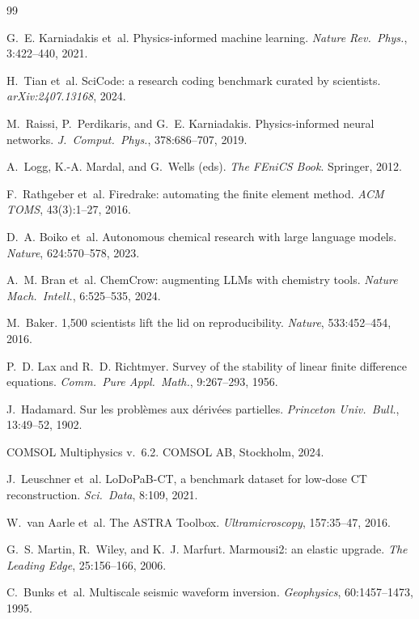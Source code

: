 \documentclass[11pt,a4paper]{article}
\begin{document}
\begin{thebibliography}{99}

G.~E. Karniadakis et~al. Physics-informed machine learning. \emph{Nature Rev.\ Phys.}, 3:422--440, 2021.

H.~Tian et~al. SciCode: a research coding benchmark curated by scientists. \emph{arXiv:2407.13168}, 2024.

M.~Raissi, P.~Perdikaris, and G.~E. Karniadakis. Physics-informed neural networks. \emph{J.\ Comput.\ Phys.}, 378:686--707, 2019.

A.~Logg, K.-A. Mardal, and G.~Wells (eds). \emph{The FEniCS Book}. Springer, 2012.

F.~Rathgeber et~al. Firedrake: automating the finite element method. \emph{ACM TOMS}, 43(3):1--27, 2016.

D.~A. Boiko et~al. Autonomous chemical research with large language models. \emph{Nature}, 624:570--578, 2023.

A.~M. Bran et~al. ChemCrow: augmenting LLMs with chemistry tools. \emph{Nature Mach.\ Intell.}, 6:525--535, 2024.

M.~Baker. 1,500 scientists lift the lid on reproducibility. \emph{Nature}, 533:452--454, 2016.

P.~D. Lax and R.~D. Richtmyer. Survey of the stability of linear finite difference equations. \emph{Comm.\ Pure Appl.\ Math.}, 9:267--293, 1956.

J.~Hadamard. Sur les probl\`emes aux d\'eriv\'ees partielles. \emph{Princeton Univ.\ Bull.}, 13:49--52, 1902.

COMSOL Multiphysics v.~6.2. COMSOL AB, Stockholm, 2024.

J.~Leuschner et~al. LoDoPaB-CT, a benchmark dataset for low-dose CT reconstruction. \emph{Sci.\ Data}, 8:109, 2021.

W.~van Aarle et~al. The ASTRA Toolbox. \emph{Ultramicroscopy}, 157:35--47, 2016.

G.~S. Martin, R.~Wiley, and K.~J. Marfurt. Marmousi2: an elastic upgrade. \emph{The Leading Edge}, 25:156--166, 2006.

C.~Bunks et~al. Multiscale seismic waveform inversion. \emph{Geophysics}, 60:1457--1473, 1995.


\end{thebibliography}
\end{document}
